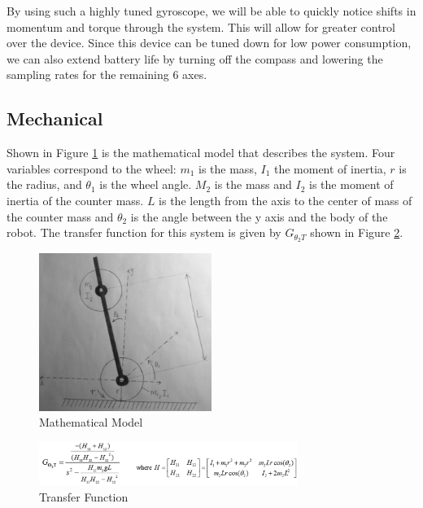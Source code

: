 \documentclass[11pt]{report}
\begin{document}
\begin{spacing}{1.5}
By using such a highly tuned gyroscope, we will be able to quickly notice shifts in momentum and torque through the system.  This will allow for greater control over the device. Since this device can be tuned down for low power consumption, we can also extend battery life by turning off the compass and lowering the sampling rates for the remaining 6 axes.

\subsection*{Mechanical}

Shown in Figure \ref{MathDiagram} is the mathematical model that describes the system.  Four variables correspond to the wheel: $m_1$ is the mass, $I_1$ the moment of inertia, $r$ is the radius, and $\theta_1$ is the wheel angle.  $M_2$ is the mass and $I_2$ is the moment of inertia of the counter mass.  $L$ is the length from the axis to the center of mass of the counter mass and $\theta_2$ is the angle between the y axis and the body of the robot.  The transfer function for this system is given by $G_{\theta_2 T}$ shown in Figure \ref{TransferFunction}.

\begin{figure}[H]
    \centering
    \includegraphics[width=0.5\textwidth]{MathDiagram}
    \caption{Mathematical Model}
    \label{MathDiagram}
\end{figure}

\begin{figure}[H]
    \centering
    \includegraphics[width=0.75\textwidth]{TransferFunction}
    \caption{Transfer Function}
    \label{TransferFunction}
\end{figure}


\end{spacing}
\end{document}
